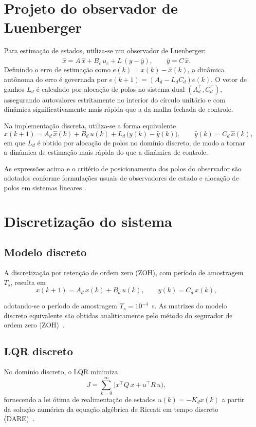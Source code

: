 \section{Projeto do observador de Luenberger}
\label{sec:projeto-observador-luenberger}
Para estimação de estados, utiliza-se um observador de Luenberger:
\[
    \dot{\hat{x}} = A\,\hat{x} + B_c\,u_c + L\,(y-\hat{y}),
    \qquad \hat{y}=C\,\hat{x}.
\]
Definindo o erro de estimação como $e(k)=x(k)-\hat{x}(k)$, a dinâmica autônoma do erro é governada por $e(k+1)=(A_d - L_d C_d)e(k)$. O vetor de ganhos $L_d$ é calculado por alocação de polos no sistema dual $(A_d^\top, C_d^\top)$, assegurando autovalores estritamente no interior do círculo unitário e com dinâmica significativamente mais rápida que a da malha fechada de controle.

Na implementação discreta, utiliza-se a forma equivalente
\[
    \hat{x}(k+1)=A_d\,\hat{x}(k)+B_d\,u(k)+L_d\,\big(y(k)-\hat{y}(k)\big),\qquad \hat{y}(k)=C_d\,\hat{x}(k),
\]
em que $L_d$ é obtido por alocação de polos no domínio discreto, de modo a tornar a dinâmica de estimação mais rápida do que a dinâmica de controle.

As expressões acima e o critério de posicionamento dos polos do observador são adotados conforme formulações usuais de observadores de estado e alocação de polos em sistemas lineares \cite{Ogata1997,FranklinPowellWorkman1998}.
\section{Discretização do sistema}
\label{sec:discretizacao-sistema}

\subsection{Modelo discreto}
\label{sec:modelo-discreto}
A discretização por retenção de ordem zero (ZOH), com período de amostragem $T_s$, resulta em
\[
    x(k+1)=A_d\,x(k)+B_d\,u(k),\qquad y(k)=C_d\,x(k),
\]

adotando-se o período de amostragem $T_s=10^{-4}$~s. As matrizes do modelo discreto equivalente são obtidas analiticamente pelo método do segurador de ordem zero (ZOH)~\cite{FranklinPowellWorkman1998,BrunoAAngelico2018}.

\subsection{LQR discreto}
\label{sec:projeto-lqr-discreto}
No domínio discreto, o LQR minimiza
\[
    J=\sum_{k=0}^{\infty} \big(x^\top Q\,x + u^\top R\,u\big),
\]
fornecendo a lei ótima de realimentação de estados $u(k)=-K_d x(k)$ a partir da solução numérica da equação algébrica de Riccati em tempo discreto (DARE)~\cite{FranklinPowellWorkman1998,Ogata1997}.

